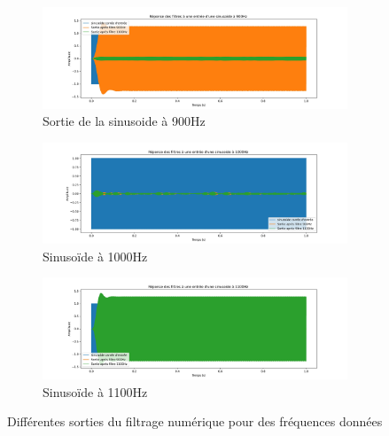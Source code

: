 \begin{figure}[H]
    \centering
    \begin{subfigure}[b]{0.75\textwidth}
        \centering
        \includegraphics[width=\textwidth]{Pictures/graphique_900Hz.jpeg}
        \caption{Sortie de la sinusoide à 900Hz}
        \label{fig:image1}
    \end{subfigure}
    \begin{subfigure}[b]{0.75\textwidth}
        \centering
        \includegraphics[width=\textwidth]{Pictures/graphique_1000Hz.jpeg}
        \caption{Sinusoïde à 1000Hz}
        \label{fig:image2}
    \end{subfigure}   
    \begin{subfigure}[b]{0.75\textwidth}
        \centering
        \includegraphics[width=\textwidth]{Pictures/graphique_1100Hz.jpeg}
        \caption{Sinusoïde à 1100Hz}
        \label{fig:image3}
    \end{subfigure}
    \caption{Différentes sorties du filtrage numérique pour des fréquences données}
    \label{fig:subplots}
\end{figure}


